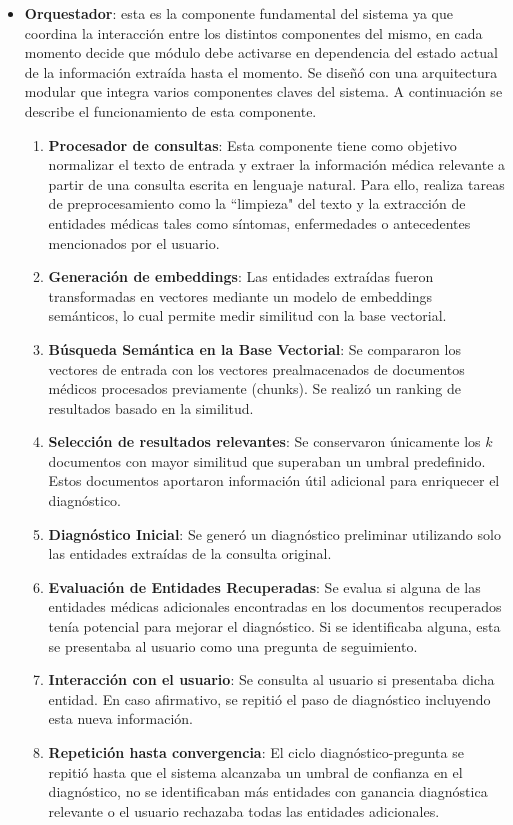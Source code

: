 \documentclass{llncs}
\begin{document}
\begin{itemize}
  \item \textbf{Orquestador}: esta es la componente fundamental del sistema ya que coordina la interacción entre los distintos componentes del mismo, en cada momento decide que módulo debe activarse en dependencia del estado actual de la información extraída hasta el momento. Se diseñó
  con una arquitectura modular que integra varios componentes claves del sistema. A continuación se describe el funcionamiento de esta componente.
  \begin{enumerate}
    \item \textbf{Procesador de consultas}: Esta componente tiene como objetivo normalizar el texto de entrada y extraer la información médica relevante a partir de una consulta escrita en lenguaje natural. Para ello, realiza tareas de preprocesamiento como la ``limpieza" del texto y la
    extracción de entidades médicas tales como síntomas, enfermedades o antecedentes mencionados por el usuario.
    \item \textbf{Generación de embeddings}: Las entidades extraídas fueron transformadas en vectores mediante un modelo de embeddings semánticos, lo cual permite medir similitud con la base vectorial.
    \item \textbf{Búsqueda Semántica en la Base Vectorial}: Se compararon los vectores de entrada con los vectores prealmacenados de documentos médicos procesados previamente (chunks). Se realizó un ranking de resultados basado en la similitud.
    \item \textbf{Selección de resultados relevantes}:  Se conservaron únicamente los $k$ documentos con mayor similitud que superaban un umbral predefinido. Estos documentos aportaron información útil adicional para enriquecer el diagnóstico.
    \item \textbf{Diagnóstico Inicial}: Se generó un diagnóstico preliminar utilizando solo las entidades extraídas de la consulta original.
    \item \textbf{Evaluación de Entidades Recuperadas}:  Se evalua si alguna de las entidades médicas adicionales encontradas en los documentos recuperados tenía potencial para mejorar el diagnóstico. Si se identificaba alguna, esta se presentaba al usuario como una pregunta de seguimiento.
    \item \textbf{Interacción con el usuario}: Se consulta al usuario si presentaba dicha entidad. En caso afirmativo, se repitió el paso de diagnóstico incluyendo esta nueva información.
    \item \textbf{Repetición hasta convergencia}: El ciclo diagnóstico-pregunta se repitió hasta que el sistema alcanzaba un umbral de confianza en el diagnóstico, no se identificaban más entidades con ganancia diagnóstica relevante o el usuario rechazaba todas las entidades adicionales.

\end{enumerate}
\end{itemize}
\end{document}

